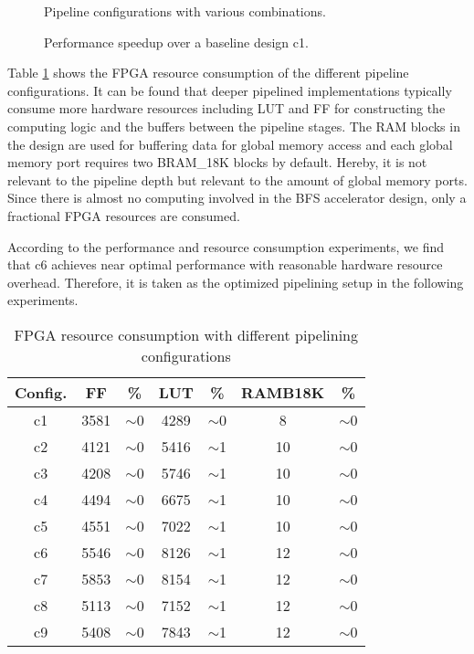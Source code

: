 \begin{figure}
    \caption{Pipeline configurations with various combinations.}
\label{fig:pipeline-config}
\end{figure}

\begin{figure}
    \caption{Performance speedup over a baseline design c1.}
\label{fig:pipeline-performance}
\end{figure}

Table \ref{tab:hash-resource} shows the FPGA resource consumption of the different 
pipeline configurations. It can be found that deeper pipelined implementations typically 
consume more hardware resources including LUT and FF for constructing the 
computing logic and the buffers between the pipeline stages. The RAM blocks in the design 
are used for buffering data for global memory access and each global memory port requires 
two BRAM\_18K blocks by default. Hereby, it is not relevant to the pipeline depth but relevant to 
the amount of global memory ports. 
Since there is almost no computing involved in the BFS accelerator design, only a fractional 
FPGA resources are consumed.

According to the performance and resource consumption experiments, we find that 
c6 achieves near optimal performance with reasonable hardware resource overhead.
Therefore, it is taken as the optimized pipelining setup in the following experiments.

\begin{table}
  \caption{FPGA resource consumption with different pipelining configurations}
  \label{tab:hash-resource}
    \centering
  \begin{tabular}{ccccccc}
    \toprule
      Config. & FF & \% & LUT & \% & RAMB18K & \% \\
    \midrule
      c1 & 3581 & $\sim$0 & 4289 & $\sim$0 & 8  & $\sim$0 \\
      c2 & 4121 & $\sim$0 & 5416 & $\sim$1 & 10 & $\sim$0 \\
      c3 & 4208 & $\sim$0 & 5746 & $\sim$1 & 10 & $\sim$0 \\
      c4 & 4494 & $\sim$0 & 6675 & $\sim$1 & 10 & $\sim$0 \\
      c5 & 4551 & $\sim$0 & 7022 & $\sim$1 & 10 & $\sim$0 \\
      c6 & 5546 & $\sim$0 & 8126 & $\sim$1 & 12 & $\sim$0 \\
      c7 & 5853 & $\sim$0 & 8154 & $\sim$1 & 12 & $\sim$0 \\
      c8 & 5113 & $\sim$0 & 7152 & $\sim$1 & 12 & $\sim$0 \\
      c9 & 5408 & $\sim$0 & 7843 & $\sim$1 & 12 & $\sim$0 \\
  \bottomrule
\end{tabular}
\end{table}

